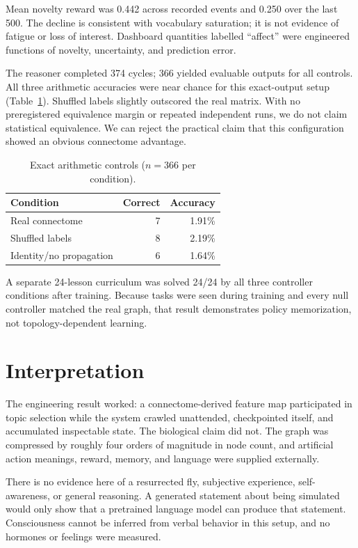 \documentclass[9pt,twocolumn]{extarticle}
\begin{document}
Mean novelty reward was 0.442 across recorded events and 0.250 over the last 500. The decline is consistent with vocabulary saturation; it is not evidence of fatigue or loss of interest. Dashboard quantities labelled ``affect'' were engineered functions of novelty, uncertainty, and prediction error.

The reasoner completed 374 cycles; 366 yielded evaluable outputs for all controls. All three arithmetic accuracies were near chance for this exact-output setup (Table~\ref{tab:reasoning}). Shuffled labels slightly outscored the real matrix. With no preregistered equivalence margin or repeated independent runs, we do not claim statistical equivalence. We can reject the practical claim that this configuration showed an obvious connectome advantage.

\begin{table}[h]
\centering
\caption{Exact arithmetic controls ($n=366$ per condition).}
\label{tab:reasoning}
\small
\begin{tabular}{lrr}
\toprule
Condition & Correct & Accuracy\\
\midrule
Real connectome & 7 & 1.91\%\\
Shuffled labels & 8 & 2.19\%\\
Identity/no propagation & 6 & 1.64\%\\
\bottomrule
\end{tabular}
\end{table}

A separate 24-lesson curriculum was solved 24/24 by all three controller conditions after training. Because tasks were seen during training and every null controller matched the real graph, that result demonstrates policy memorization, not topology-dependent learning.

\section{Interpretation}
The engineering result worked: a connectome-derived feature map participated in topic selection while the system crawled unattended, checkpointed itself, and accumulated inspectable state. The biological claim did not. The graph was compressed by roughly four orders of magnitude in node count, and artificial action meanings, reward, memory, and language were supplied externally.

There is no evidence here of a resurrected fly, subjective experience, self-awareness, or general reasoning. A generated statement about being simulated would only show that a pretrained language model can produce that statement. Consciousness cannot be inferred from verbal behavior in this setup, and no hormones or feelings were measured.
\end{document}
